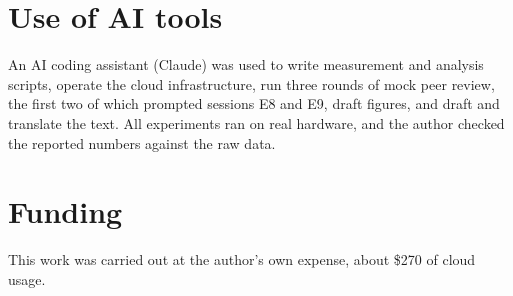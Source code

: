 \documentclass[11pt]{article}
\begin{document}
\section*{Use of AI tools}
An AI coding assistant (Claude) was used to write measurement and analysis scripts, operate the cloud infrastructure, run three rounds of mock peer review, the first two of which prompted sessions E8 and E9, draft figures, and draft and translate the text. All experiments ran on real hardware, and the author checked the reported numbers against the raw data.

\section*{Funding}
This work was carried out at the author's own expense, about \$270 of cloud usage.




\clearpage
\appendix
\setcounter{figure}{0}
\renewcommand{\thefigure}{A\arabic{figure}}
\renewcommand{\thetable}{\thesection\arabic{table}}
\end{document}
